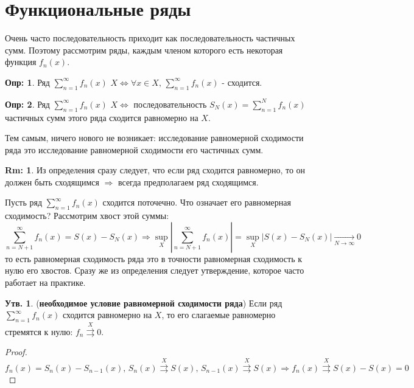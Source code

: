 \documentclass[12pt]{article}
\theoremstyle{definition}
\newtheorem{defn}{Опр:}
\newtheorem{rem}{Rm:}
\newtheorem{prop}{Утв.}
\newcommand{\uconv}[1]{\overset{#1}{\rightrightarrows}}
\begin{document}
\section*{Функциональные ряды}
Очень часто последовательность приходит как последовательность частичных сумм. Поэтому рассмотрим ряды, каждым членом которого есть некоторая функция $f_n(x)$.
\begin{defn}
	Ряд $\displaystyle \sum\limits_{n = 1}^{\infty}f_n(x)$  $X \Leftrightarrow \forall x \in X, \, \displaystyle \sum\limits_{n = 1}^{\infty}f_n(x)$ - сходится.
\end{defn}
\begin{defn}
	Ряд $\displaystyle \sum\limits_{n = 1}^{\infty}f_n(x)$  $X \Leftrightarrow $ последовательность $S_N(x) = \displaystyle\sum\limits_{n = 1}^N f_n(x)$ частичных сумм этого ряда  сходится равномерно на $X$.
\end{defn}
Тем самым, ничего нового не возникает: исследование равномерной сходимости ряда это исследование равномерной сходимости его частичных сумм. 
\begin{rem}
	Из определения сразу следует, что если ряд сходится равномерно, то он должен быть сходящимся $\Rightarrow$ всегда предполагаем ряд сходящимся.
\end{rem}
Пусть ряд $\displaystyle \sum\limits_{n = 1}^{\infty}f_n(x)$ сходится поточечно. Что означает его равномерная сходимость? Рассмотрим хвост этой суммы:
$$
	\sum\limits_{n = N+1}^{\infty} f_n(x) = S(x) - S_N(x) \Rightarrow \sup\limits_X \left|\sum\limits_{n = N+1}^{\infty} f_n(x) \right|= \sup\limits_X \left|S(x) - S_N(x)\right| \xrightarrow[N \to \infty]{} 0
$$
то есть равномерная сходимость ряда это в точности равномерная сходимость к нулю его хвостов. Сразу же из определения следует утверждение, которое часто работает на практике.
\begin{prop}(\textbf{необходимое условие равномерной сходимости ряда})
	Если ряд $\displaystyle \sum\limits_{n = 1}^{\infty}f_n(x)$ сходится равномерно на $X$, то его слагаемые равномерно стремятся к нулю: $f_n \uconv{X}0$.
\end{prop}
\begin{proof}
	$$
		f_n(x) = S_n(x) - S_{n-1}(x), \, S_n(x) \uconv{X} S(x), \, S_{n-1}(x) \uconv{X} S(x) \Rightarrow f_n(x) \uconv{X} S(x) - S(x) = 0
	$$
\end{proof}
\end{document}
